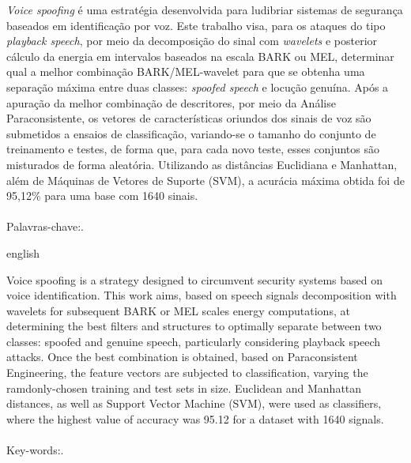 \begin{resumo}
	\par \textit{Voice spoofing} é uma estratégia desenvolvida para ludibriar sistemas de segurança baseados em identificação por voz. Este trabalho visa, para os ataques do tipo \textit{playback speech}, por meio da decomposição do sinal com \textit{wavelets} e posterior cálculo da energia em intervalos baseados na escala BARK ou MEL, determinar qual a melhor combinação BARK/MEL-wavelet para que se obtenha uma separação máxima entre duas classes: \textit{spoofed speech} e locução genuína. Após a apuração da melhor combinação de descritores, por meio da Análise Paraconsistente, os vetores de características oriundos dos sinais de voz são submetidos a ensaios de classificação, variando-se o tamanho do conjunto de treinamento e testes, de forma que, para cada novo teste, esses conjuntos são misturados de forma aleatória. Utilizando as distâncias Euclidiana e Manhattan, além de Máquinas de Vetores de Suporte (SVM), a acurácia máxima obtida foi de 95,12\% para uma base com 1640 sinais.\\\\
	Palavras-chave:\ptBRkeyWords.
\end{resumo}

\begin{resumo}[Abstract]
	\begin{otherlanguage*}{english}
		\par Voice spoofing is a strategy designed to circumvent security systems based on voice identification. This work aims, based on speech signals decomposition with wavelets for subsequent BARK or MEL scales energy computations, at determining the best filters and structures to optimally separate between two classes: spoofed and genuine speech, particularly considering playback speech attacks. Once the best combination is obtained, based on Paraconsistent Engineering, the feature vectors are subjected to classification, varying the ramdonly-chosen training and test sets in size. Euclidean and Manhattan distances, as well as Support Vector Machine (SVM), were used as classifiers, where the highest value of accuracy was 95.12 for a dataset with 1640 signals.\\\\
		Key-words:\enUSkeyWords .
	 \end{otherlanguage*}
\end{resumo}






